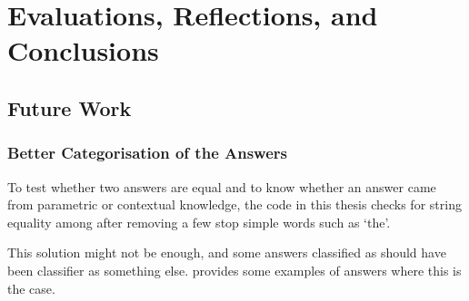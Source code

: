 \section{Evaluations, Reflections, and Conclusions}

\subsection{Future Work}

\subsubsection{Better Categorisation of the Answers}
\label{other_problems}

To test whether two answers are equal and to know whether an answer came from parametric or contextual knowledge, the code in this thesis checks for string equality among after removing a few stop simple words such as `the'.

This solution might not be enough, and some answers classified as \Other{} should have been classifier as something else.
 provides some examples of answers where this is the case.

